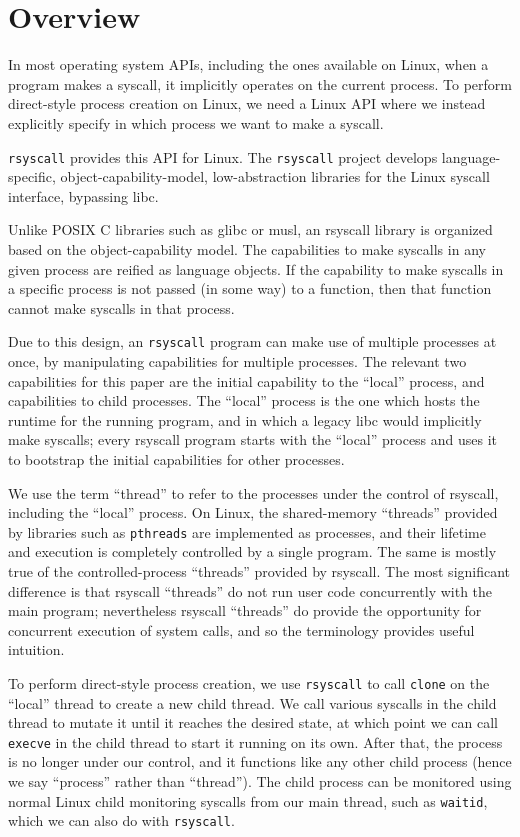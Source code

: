\documentclass[sigplan]{acmart}
\begin{document}
\section{Overview}\label{overview}
In most operating system APIs, including the ones available on Linux,
when a program makes a syscall, it implicitly operates on the current process.
To perform direct-style process creation on Linux,
we need a Linux API where we instead explicitly specify in which process we want to make a syscall.

\texttt{rsyscall} provides this API for Linux.
The \texttt{rsyscall} project develops
language-specific, object-capability-model, low-abstraction libraries for the Linux syscall interface,
bypassing libc.

Unlike POSIX C libraries such as glibc or musl,
an rsyscall library is organized based on the object-capability model.
The capabilities to make syscalls in any given process are reified as language objects.
If the capability to make syscalls in a specific process is not passed (in some way) to a function,
then that function cannot make syscalls in that process.

Due to this design, an \texttt{rsyscall} program can make use of multiple processes at once,
by manipulating capabilities for multiple processes.
The relevant two capabilities for this paper are the initial capability to the ``local'' process,
and capabilities to child processes.
The ``local'' process is the one which hosts the runtime for the running program,
and in which a legacy libc would implicitly make syscalls;
every rsyscall program starts with the ``local'' process
and uses it to bootstrap the initial capabilities for other processes.

We use the term ``thread'' to refer to the processes under the control of rsyscall,
including the ``local'' process.
On Linux, the shared-memory ``threads'' provided by libraries such as \texttt{pthreads}
are implemented as processes,
and their lifetime and execution is completely controlled by a single program.
The same is mostly true of the controlled-process ``threads'' provided by rsyscall.
The most significant difference is that rsyscall ``threads''
do not run user code concurrently with the main program;
nevertheless rsyscall ``threads'' do provide the opportunity for concurrent execution of system calls,
and so the terminology provides useful intuition.

To perform direct-style process creation,
we use \texttt{rsyscall} to call \texttt{clone} on the ``local'' thread to create a new child thread.
We call various syscalls in the child thread to mutate it until it reaches the desired state,
at which point we can call \texttt{execve} in the child thread to start it running on its own.
After that, the process is no longer under our control, and it functions like any other child process
(hence we say ``process'' rather than ``thread'').
The child process can be monitored using normal Linux child monitoring syscalls from our main thread,
such as \texttt{waitid},
which we can also do with \texttt{rsyscall}.
\end{document}
